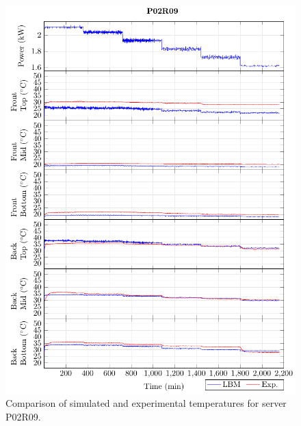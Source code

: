 \documentclass[border=10pt,preview]{standalone}
\begin{document}
\begin{figure}[!htb]
\centering
\includegraphics[width=\linewidth]{Plots/P02R09_T.pdf}
\caption{Comparison of simulated and experimental temperatures for server P02R09.}
\label{fig:P02R09_plot}
\end{figure}

\clearpage
\end{document}
